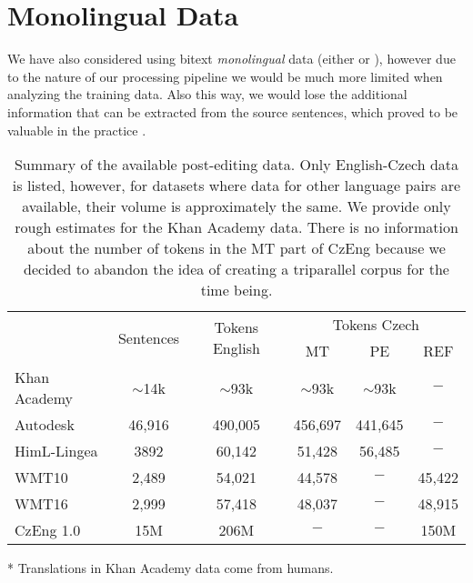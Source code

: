 \section{Monolingual Data}

We have also considered using bitext \emph{monolingual} data (either 
or ), however due to the nature of our processing
pipeline we would be much more limited when analyzing the training data. Also this way, we would
lose the additional information that can be extracted from the source sentences, which proved to be valuable in the practice \citep{biblio:RoMaDEPFIXA2012}.


\begin{table*}[t]
\centering
\small

\begin{threeparttable}
\begin{tabular}{|l|c|c|c|c|c|}
\hline
\multirow{2}{*}{}  &  \multirow{2}{*}{\hash{} Sentences}  &  \multirow{2}{*}{\hash{} Tokens English}  &  \multicolumn{3}{c|}{\hash{} Tokens Czech}  \\
\cline{4-6}
&  &  & MT & PE & REF \\
\hline
Khan Academy & $\sim$14k & $\sim$93k & $\sim$93k\tnote{*} & $\sim$93k & $-$ \\
\hline
Autodesk & 46,916 & 490,005 & 456,697 & 441,645 & $-$ \\
\hline
HimL-Lingea & 3892 & 60,142 & 51,428 & 56,485 & $-$ \\
\hline
WMT10 & 2,489 & 54,021 & 44,578 & $-$ & 45,422 \\
\hline
WMT16 & 2,999 & 57,418 & 48,037 & $-$ & 48,915 \\
\hline
CzEng 1.0 & 15M & 206M & $-$ & $-$ & 150M \\
\hline
\end{tabular}
\begin{tablenotes}
\item[*] Translations in Khan Academy data come from humans.
\end{tablenotes}
\end{threeparttable}
\caption[Summary of the available data]{Summary of the available post-editing data. Only English-Czech data is listed, however, for datasets
where data for other language pairs are available, their volume is approximately the same. We provide only rough estimates for the Khan Academy data.
There is no information about the number of tokens in the MT part of CzEng because we decided to abandon the
idea of creating a triparallel corpus for the time being.
}
\label{avail-data}
\end{table*}

